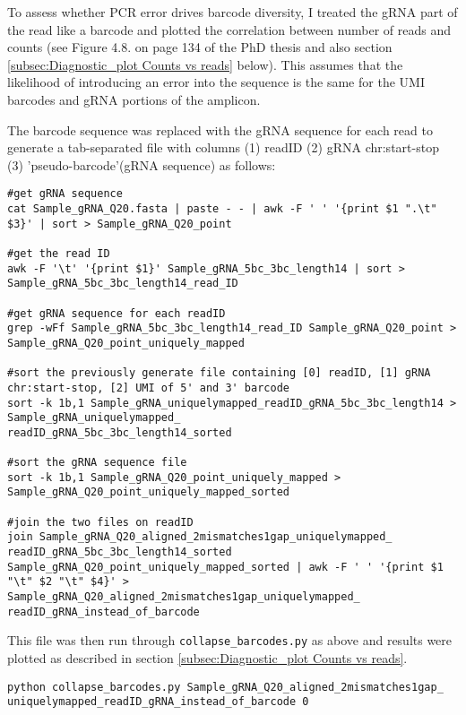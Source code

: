 To assess whether PCR error drives barcode diversity, I treated the gRNA part of the read like a barcode and plotted the correlation between number of reads and counts (see Figure 4.8. on page 134 of the PhD thesis and also section  \ref{subsec:Diagnostic_plot Counts vs reads} below). This assumes that the likelihood of introducing an error into the sequence is the same for the UMI barcodes and gRNA portions of the amplicon.

The barcode sequence was replaced with the gRNA sequence for each read to generate a tab-separated file with columns (1) readID (2) gRNA chr:start-stop (3) 'pseudo-barcode'(gRNA sequence) as follows:

\begin{small}\begin{lstlisting}
#get gRNA sequence 
cat Sample_gRNA_Q20.fasta | paste - - | awk -F ' ' '{print $1 ".\t" $3}' | sort > Sample_gRNA_Q20_point

#get the read ID
awk -F '\t' '{print $1}' Sample_gRNA_5bc_3bc_length14 | sort > Sample_gRNA_5bc_3bc_length14_read_ID

#get gRNA sequence for each readID
grep -wFf Sample_gRNA_5bc_3bc_length14_read_ID Sample_gRNA_Q20_point > Sample_gRNA_Q20_point_uniquely_mapped

#sort the previously generate file containing [0] readID, [1] gRNA chr:start-stop, [2] UMI of 5' and 3' barcode
sort -k 1b,1 Sample_gRNA_uniquelymapped_readID_gRNA_5bc_3bc_length14 > Sample_gRNA_uniquelymapped_
readID_gRNA_5bc_3bc_length14_sorted

#sort the gRNA sequence file
sort -k 1b,1 Sample_gRNA_Q20_point_uniquely_mapped > Sample_gRNA_Q20_point_uniquely_mapped_sorted

#join the two files on readID
join Sample_gRNA_Q20_aligned_2mismatches1gap_uniquelymapped_
readID_gRNA_5bc_3bc_length14_sorted Sample_gRNA_Q20_point_uniquely_mapped_sorted | awk -F ' ' '{print $1 "\t" $2 "\t" $4}' > Sample_gRNA_Q20_aligned_2mismatches1gap_uniquelymapped_
readID_gRNA_instead_of_barcode
\end{lstlisting}\end{small}

This file was then run through \verb|collapse_barcodes.py| as above and results were plotted as described in section \ref{subsec:Diagnostic_plot Counts vs reads}.

\begin{small}\begin{lstlisting}
python collapse_barcodes.py Sample_gRNA_Q20_aligned_2mismatches1gap_
uniquelymapped_readID_gRNA_instead_of_barcode 0
\end{lstlisting}\end{small}

